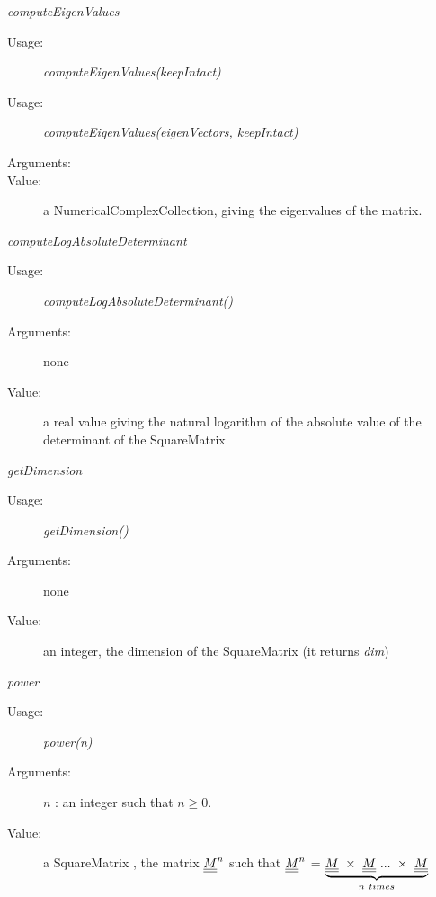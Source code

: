 \begin{description}
\begin{description}
\item \textit{computeEigenValues}
\begin{description}
\item[Usage:] \textit{computeEigenValues(keepIntact)}
\item[Usage:] \textit{computeEigenValues(eigenVectors, keepIntact)}
\item[Arguments:]  \rule{0pt}{1em}
\item[Value:] a NumericalComplexCollection, giving the eigenvalues of the matrix.
\end{description}
\bigskip

\item \textit{computeLogAbsoluteDeterminant}
\begin{description}
\item[Usage:] \textit{computeLogAbsoluteDeterminant()}
\item[Arguments:] none
\item[Value:] a real value giving the natural logarithm of the absolute value of the determinant of the SquareMatrix
\end{description}
\bigskip

\item \textit{getDimension}
\begin{description}
\item[Usage:] \textit{getDimension()}
\item[Arguments:] none
\item[Value:] an integer, the dimension of the SquareMatrix (it returns \textit{dim})
\end{description}
\bigskip

\item \textit{power}
\begin{description}
\item[Usage:] \textit{power(n)}
\item[Arguments:] $n$ : an integer such that $n\geq 0$.
\item[Value:] a SquareMatrix , the matrix ${\underline{\underline{M}}}^n$ such that ${\underline{\underline{M}}}^n$  = $\underbrace{\mat{M} \ \times \ \mat{M} \ ...\ \times \ \mat{M}}_{n\ times}$
\end{description}
\bigskip

\end{description}

\end{description}

